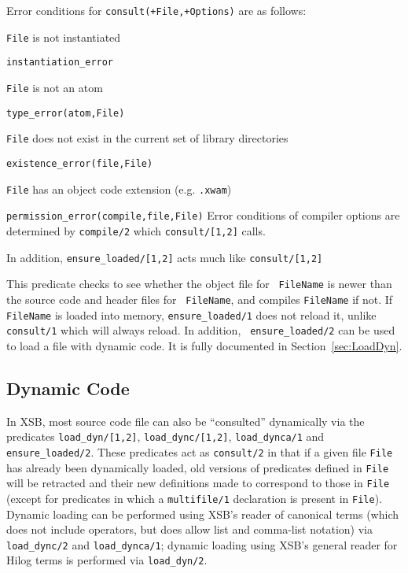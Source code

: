 \begin{description}
Error conditions for {\tt consult(+File,+Options)} are as follows: 
\bi
\item 	{\tt File} is not instantiated
\bi
\item 	{\tt instantiation\_error}
\ei
%
\item 	{\tt File} is not an atom
\bi
\item 	{\tt type\_error(atom,File)}
\ei
\item 	{\tt File} does not exist in the current set of library directories
\bi
\item 	{\tt existence\_error(file,File)}
\ei
%
\item 	{\tt File} has an object code extension (e.g. {\tt .xwam})
\bi
\item 	{\tt permission\_error(compile,file,File)}
\ei
%
\ei
Error conditions of compiler options are determined by {\tt compile/2}
which {\tt consult/[1,2]} calls.
\end{description}

In addition, {\tt ensure\_loaded/[1,2]} acts much like {\tt consult/[1,2]}
\begin{description}
%
This predicate checks to see whether the object file for {\tt
FileName} is newer than the source code and header files for {\tt
FileName}, and compiles {\tt FileName} if not.  If {\tt FileName} is
loaded into memory, {\tt ensure\_loaded/1} does not reload it, unlike
{\tt consult/1} which will always reload.  In addition, {\tt
  ensure\_loaded/2} can be used to load a file with dynamic code.  It
is fully documented in Section~\ref{sec:LoadDyn}.
\end{description}
% 

\subsection{Dynamic Code}
% 
In XSB, most source code file can also be ``consulted'' dynamically
via the predicates {\tt load\_dyn/[1,2]}, {\tt load\_dync/[1,2]}, {\tt load\_dynca/1} and
{\tt ensure\_loaded/2}.  These predicates act as {\tt consult/2} in
that if a given file {\tt File} has already been dynamically loaded,
old versions of predicates defined in {\tt File} will be retracted and
their new definitions made to correspond to those in {\tt File}
(except for predicates in which a {\tt multifile/1} declaration is
present in {\tt File}).  Dynamic loading can be performed using XSB's
reader of canonical terms (which does not include operators, but does
allow list and comma-list notation) via {\tt load\_dync/2} and {\tt load\_dynca/1}; dynamic
loading using XSB's general reader for Hilog terms is performed via
{\tt load\_dyn/2}.  

